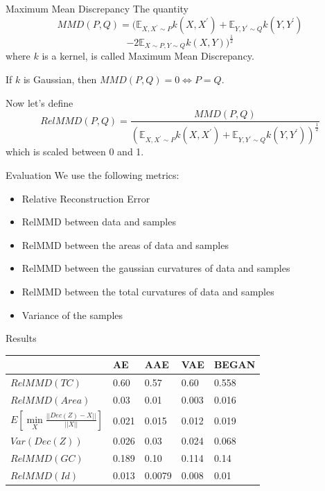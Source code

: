 \documentclass{beamer}
\begin{document}
\begin{frame}{Maximum Mean Discrepancy}
The quantity $$MMD(P, Q)= (\mathbb{E}_{X, X^{\prime} \sim P} k\left(X, X^{\prime}\right)+\mathbb{E}_{Y, Y^{\prime} \sim Q} k\left(Y, Y^{\prime}\right)$$ $$-2 \mathbb{E}_{X \sim P, Y \sim Q} k(X, Y))^{\frac{1}{2}}$$ where $k$ is a kernel, is called Maximum Mean Discrepancy.
\begin{theorem}
If $k$ is Gaussian, then $MMD(P,Q)=0\Leftrightarrow P=Q$.
\end{theorem}
Now let's define $$RelMMD(P,Q)=\frac{MMD(P,Q)}{(\mathbb{E}_{X, X^{\prime} \sim P} k\left(X, X^{\prime}\right)+\mathbb{E}_{Y, Y^{\prime} \sim Q} k\left(Y, Y^{\prime}\right))^{\frac{1}{2}}}$$
which is scaled between 0 and 1.
\end{frame}
\begin{frame}{Evaluation}
We use the following metrics:
\begin{itemize}
\item Relative Reconstruction Error
\item RelMMD between data and samples
\item RelMMD between the areas of data and samples
\item RelMMD between the gaussian curvatures of data and samples
\item RelMMD between the total curvatures of data and samples
\item Variance of the samples
\end{itemize}
\end{frame}
\begin{frame}{Results}
\begin{table}[H]
\begin{tabular}{|l|l|l|l|l|}
\hline
&   AE & AAE &  VAE &  BEGAN  \\ \hline
$RelMMD(TC)$ &  0.60 &  0.57  & 0.60 & 0.558 \\ \hline
$RelMMD(Area)$  &  0.03 &  0.01 & 0.003 &  0.016  \\ \hline
$E[\min\limits_{X} \frac{||Dec(Z)-X||}{||X||}]$&  0.021 & 0.015 &  0.012 &  0.019   \\ \hline
$Var(Dec(Z))$& 0.026 &   0.03 &  0.024 &  0.068  \\ \hline
$RelMMD(GC)$ & 0.189 & 0.10 &  0.114 &  0.14  \\ \hline
$RelMMD(Id)$ &  0.013 &  0.0079 &  0.008 &  0.01 \\ \hline
\end{tabular}
\end{table}

\end{frame}
\end{document}
